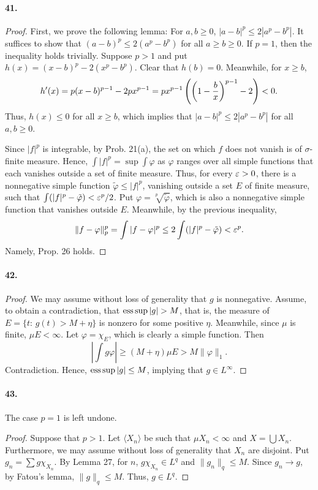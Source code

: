   \paragraph{41.}
  \begin{proof}
    First, we prove the following lemma: For $a,b\ge 0$, $|a-b|^p\le 2|a^p-
    b^p|$. It suffices to show that $(a-b)^p\le 2(a^p-b^p)$ for all $a\ge b\ge 
    0$. If $p=1$, then the inequality holds trivially. Suppose $p>1$ and put
    $h(x)=(x-b)^p-2(x^p-b^p)$. Clear that $h(b)=0$. Meanwhile, for $x\ge b$, 
    \[
      h^\prime(x)=p(x-b)^{p-1}-2px^{p-1}=px^{p-1}
      \left(\left(1-\frac{b}{x}\right)^{p-1}-2\right)<0.
    \]
    Thus, $h(x)\le 0$ for all $x\ge b$, which implies that $|a-b|^p\le 2|a^p-
    b^p|$ for all $a,b\ge 0$.\par
    Since $|f|^p$ is integrable, by Prob. 21(a), the set on which $f$ does not
    vanish is of $\sigma$-finite measure. Hence, $\int|f|^p=\sup\int\varphi$
    as $\varphi$ ranges over all simple functions that each vanishes outside a 
    set of finite measure. Thus, for every $\varepsilon>0$, there is a nonnegative 
    simple function $\tilde{\varphi}\le|f|^p$, vanishing outside a set $E$ of 
    finite measure, such that $\int(|f|^p-\tilde{\varphi})<\varepsilon^p/2$. Put 
    $\varphi=\sqrt[p]{\tilde{\varphi}}$, which is also a nonnegative simple 
    function that vanishes outside $E$. Meanwhile, by the previous inequality,
    \[
      \|f-\varphi\|_p^p=
      \int|f-\varphi|^p\le
      2\int(|f|^p-\tilde{\varphi})<
      \varepsilon^p.
    \]
    Namely, Prop. 26 holds.
  \end{proof}
  
  \paragraph{42.}
  \begin{proof}
    We may assume without loss of generality that $g$ is nonnegative. Assume, 
    to obtain a contradiction, that $\esssup|g|>M$, that is, the measure of
    $E=\{t:\,g(t)>M+\eta\}$ is nonzero for some positive $\eta$. Meanwhile,
    since $\mu$ is finite, $\mu E<\infty$. Let $\varphi=\chi_E$, which is 
    clearly a simple function. Then
    \[
      \left|\int g\varphi\right|\ge
      (M+\eta)\mu E>
      M\|\varphi\|_1.
    \]
    Contradiction. Hence, $\operatorname*{ess\,sup}|g|\le M$, implying that $g\in L^\infty$.
  \end{proof}
  
  \paragraph{43.}
    The case $p=1$ is left undone. 
  \begin{proof}
    Suppose that $p>1$.
    Let $\langle X_n\rangle$ be such that $\mu X_n<\infty$ and $X=\bigcup X_n$.
    Furthermore, we may assume without loss of generality that $X_n$ are 
    disjoint. Put $g_n=\sum g\chi_{X_n}$. By Lemma 27, for $n$, $g\chi_{X_n}\in 
    L^q$ and $\|g_n\|_q\le M$. Since $g_n\to g$, by Fatou's lemma, $\|g\|_q\le
    M$. Thus, $g\in L^q$.
  \end{proof}
  
